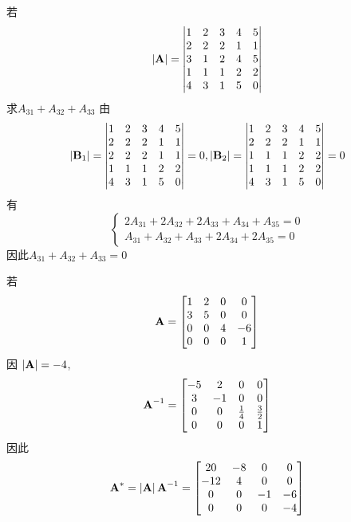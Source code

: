 \documentclass{article}
\begin{document}
\begin{examplle}[]
若
\begin{equation*}
\abs{\bA}=
\begin{vmatrix}
1&2&3&4&5\\
2&2&2&1&1\\
3&1&2&4&5\\
1&1&1&2&2\\
4&3&1&5&0
\end{vmatrix}
\end{equation*}
求\(A_{31}+A_{32}+A_{33}\)
由
\begin{equation*}
\abs{\bB_1}=
\begin{vmatrix}
1&2&3&4&5\\
2&2&2&1&1\\
2&2&2&1&1\\
1&1&1&2&2\\
4&3&1&5&0
\end{vmatrix}=0,\abs{\bB_2}=
\begin{vmatrix}
1&2&3&4&5\\
2&2&2&1&1\\
1&1&1&2&2\\
1&1&1&2&2\\
4&3&1&5&0
\end{vmatrix}=0
\end{equation*}
有
\begin{equation*}
\begin{cases}
2A_{31}+2A_{32}+2A_{33}+A_{34}+A_{35}=0\\
A_{31}+A_{32}+A_{33}+2A_{34}+2A_{35}=0
\end{cases}
\end{equation*}
因此\(A_{31}+A_{32}+A_{33}=0\)
\end{examplle}

\begin{examplle}[]
若
\begin{equation*}
\operatorname{\textbf{A}}=
\begin{bmatrix}
1&2&0&0\\
3&5&0&0\\
0&0&4&-6\\
0&0&0&1
\end{bmatrix}
\end{equation*}
因 \(\abs{\bA}=-4\),
\begin{equation*}
\operatorname{\textbf{A}}^{-1}=
\begin{bmatrix}
-5&2&0&0\\
3&-1&0&0\\
0&0&\frac{1}{4}&\frac{3}{2}\\
0&0&0&1
\end{bmatrix}
\end{equation*}
因此
\begin{equation*}
\bA^*=\abs{\bA}\bA^{-1}=
\begin{bmatrix}
20&-8&0&0\\
-12&4&0&0\\
0&0&-1&-6\\
0&0&0&-4
\end{bmatrix}
\end{equation*}
\end{examplle}
\end{document}
